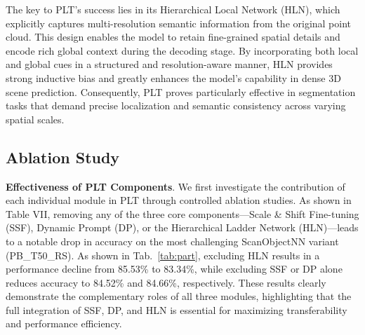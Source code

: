 The key to PLT's success lies in its Hierarchical Local Network (HLN), which explicitly captures multi-resolution semantic information from the original point cloud. This design enables the model to retain fine-grained spatial details and encode rich global context during the decoding stage. By incorporating both local and global cues in a structured and resolution-aware manner, HLN provides strong inductive bias and greatly enhances the model's capability in dense 3D scene prediction. Consequently, PLT proves particularly effective in segmentation tasks that demand precise localization and semantic consistency across varying spatial scales.













\subsection{Ablation Study}

\textbf{Effectiveness of PLT Components}. We first investigate the contribution of each individual module in PLT through controlled ablation studies. As shown in Table VII, removing any of the three core components—Scale \& Shift Fine-tuning (SSF), Dynamic Prompt (DP), or the Hierarchical Ladder Network (HLN)—leads to a notable drop in accuracy on the most challenging ScanObjectNN variant (PB\_T50\_RS). As shown in Tab.~\ref{tab:part}, excluding HLN results in a performance decline from 85.53\% to 83.34\%, while excluding SSF or DP alone reduces accuracy to 84.52\% and 84.66\%, respectively. These results clearly demonstrate the complementary roles of all three modules, highlighting that the full integration of SSF, DP, and HLN is essential for maximizing transferability and performance efficiency.

